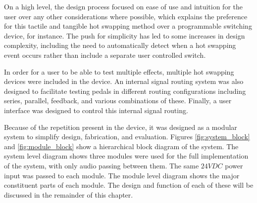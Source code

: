 On a high level, the design process focused on ease of use and intuition for the user over any other considerations where possible, which explains the preference for this tactile and tangible hot swapping method over a programmable switching device, for instance.  The push for simplicity has led to some increases in design complexity, including the need to automatically detect when a hot swapping event occurs rather than include a separate user controlled switch.

In order for a user to be able to test multiple effects, multiple hot swapping devices were included in the device.  An internal signal routing system was also designed to facilitate testing pedals in different routing configurations including series, parallel, feedback, and various combinations of these.  Finally, a user interface was designed to control this internal signal routing.

Because of the repetition present in the device, it was designed as a modular system to simplify design, fabrication, and evaluation.  Figures \ref{fig:system_block} and \ref{fig:module_block} show a hierarchical block diagram of the system.  The system level diagram shows three modules were used for the full implementation of the system, with only audio passing between them.  The same $24VDC$ power input was passed to each module.  The module level diagram shows the major constituent parts of each module.  The design and function of each of these will be discussed in the remainder of this chapter.



